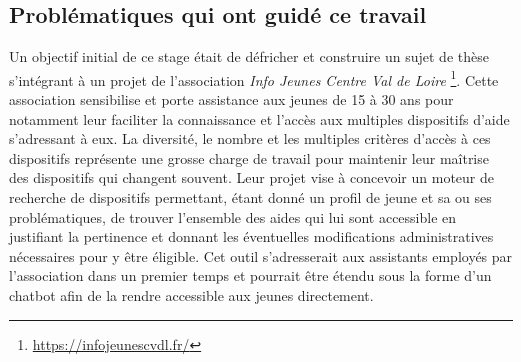         
    \subsection{Problématiques qui ont guidé ce travail}




    Un objectif initial de ce stage était de défricher et construire un sujet de thèse s'intégrant à un projet de l'association \textit{Info Jeunes Centre Val de Loire} \footnote{\url{https://infojeunescvdl.fr/}}. Cette association sensibilise et porte assistance aux jeunes de 15 à 30 ans pour notamment leur faciliter la connaissance et l'accès aux multiples dispositifs d'aide s'adressant à eux. La diversité, le nombre et les multiples critères d'accès à ces dispositifs représente une grosse charge de travail pour maintenir leur maîtrise des dispositifs qui changent souvent. Leur projet vise à concevoir un moteur de recherche de dispositifs permettant, étant donné un profil de jeune et sa ou ses problématiques, de trouver l'ensemble des aides qui lui sont accessible en justifiant la pertinence et donnant les éventuelles modifications administratives nécessaires pour y être éligible. Cet outil s’adresserait aux assistants employés par l'association dans un premier temps et pourrait être étendu sous la forme d'un chatbot afin de la rendre accessible aux jeunes directement.

